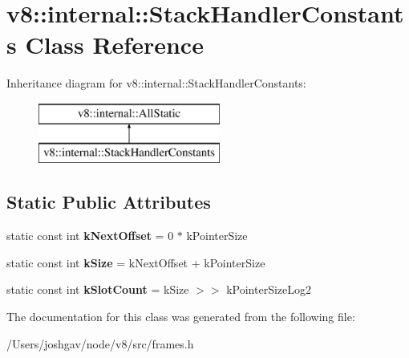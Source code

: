 \hypertarget{classv8_1_1internal_1_1_stack_handler_constants}{}\section{v8\+:\+:internal\+:\+:Stack\+Handler\+Constants Class Reference}
\label{classv8_1_1internal_1_1_stack_handler_constants}
Inheritance diagram for v8\+:\+:internal\+:\+:Stack\+Handler\+Constants\+:\begin{figure}[H]
\begin{center}
\leavevmode
\includegraphics[height=2.000000cm]{classv8_1_1internal_1_1_stack_handler_constants}
\end{center}
\end{figure}
\subsection*{Static Public Attributes}
\begin{DoxyCompactItemize}
\item 
static const int {\bfseries k\+Next\+Offset} = 0 $\ast$ k\+Pointer\+Size\hypertarget{classv8_1_1internal_1_1_stack_handler_constants_a705ae64dfed67338f0275c70e02cc458}{}\label{classv8_1_1internal_1_1_stack_handler_constants_a705ae64dfed67338f0275c70e02cc458}

\item 
static const int {\bfseries k\+Size} = k\+Next\+Offset + k\+Pointer\+Size\hypertarget{classv8_1_1internal_1_1_stack_handler_constants_abf599d4b8b409672c9e68875be6fd35e}{}\label{classv8_1_1internal_1_1_stack_handler_constants_abf599d4b8b409672c9e68875be6fd35e}

\item 
static const int {\bfseries k\+Slot\+Count} = k\+Size $>$$>$ k\+Pointer\+Size\+Log2\hypertarget{classv8_1_1internal_1_1_stack_handler_constants_aac64362c6b9a4e36fa0b39217b2185b9}{}\label{classv8_1_1internal_1_1_stack_handler_constants_aac64362c6b9a4e36fa0b39217b2185b9}

\end{DoxyCompactItemize}


The documentation for this class was generated from the following file\+:\begin{DoxyCompactItemize}
\item 
/\+Users/joshgav/node/v8/src/frames.\+h\end{DoxyCompactItemize}
